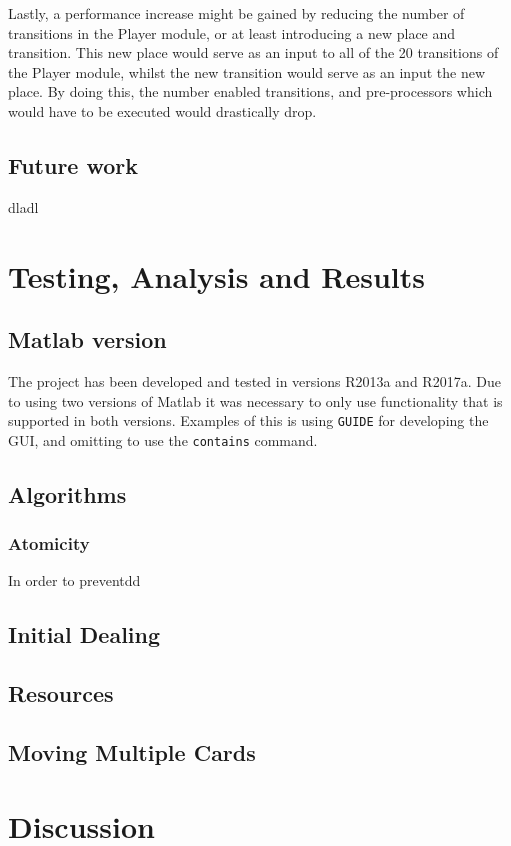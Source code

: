 \documentclass[runningheads,a4paper]{llncs}
\begin{document}
Lastly, a performance increase might be gained by reducing the number of transitions in the Player module, or at least introducing a new place and transition. This new place would serve as an input to all of the 20 transitions of the Player module, whilst the new transition would serve as an input the new place. By doing this, the number enabled transitions, and pre-processors which would have to be executed would drastically drop.
\clearpage
\subsection{Future work}
dladl
\section{Testing, Analysis and Results}
\subsection{Matlab version}
The project has been developed and tested in versions R2013a and R2017a. Due to using two versions of Matlab it was necessary to only use functionality that is supported in both versions. Examples of this is using \verb!GUIDE! for developing the GUI, and omitting to use the \verb!contains! command.
\label{sec:3_testing_analysis}
\subsection{Algorithms}
\subsubsection{Atomicity}
In order to preventdd
\subsection{Initial Dealing}
\label{sec:3_initial_dealing}
\subsection{Resources}
\subsection{Moving Multiple Cards}

\section{Discussion}
\end{document}
